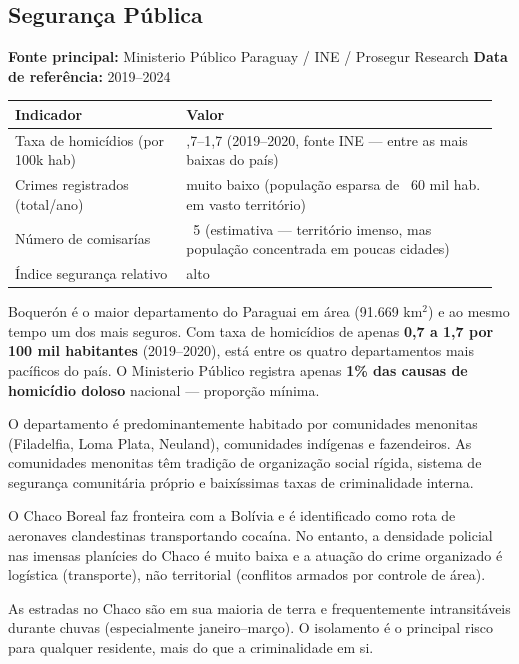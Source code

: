\subsection{Segurança Pública}

\textbf{Fonte principal:} Ministerio Público Paraguay / INE / Prosegur Research
\textbf{Data de referência:} 2019--2024


{\small
\setlength{\tabcolsep}{3pt}
\renewcommand{\arraystretch}{1.12}
\begin{tabularx}{\linewidth}{>{\raggedright\arraybackslash}p{0.34\linewidth} >{\raggedright\arraybackslash}p{0.62\linewidth}}
\toprule
Indicador & Valor \\
\midrule
Taxa de homicídios (por 100k hab) & 0,7--1,7 (2019--2020, fonte INE --- entre as mais baixas do país) \\
Crimes registrados (total/ano) & muito baixo (população esparsa de ~60 mil hab. em vasto território) \\
Número de comisarías & ~5 (estimativa --- território imenso, mas população concentrada em poucas cidades) \\
Índice segurança relativo & alto \\
\bottomrule
\end{tabularx}
}


Boquerón é o maior departamento do Paraguai em área (91.669 km$^2$) e ao mesmo tempo um dos mais seguros. Com taxa de homicídios de apenas \textbf{0,7 a 1,7 por 100 mil habitantes} (2019--2020), está entre os quatro departamentos mais pacíficos do país. O Ministerio Público registra apenas \textbf{1\% das causas de homicídio doloso} nacional --- proporção mínima.

O departamento é predominantemente habitado por comunidades menonitas (Filadelfia, Loma Plata, Neuland), comunidades indígenas e fazendeiros. As comunidades menonitas têm tradição de organização social rígida, sistema de segurança comunitária próprio e baixíssimas taxas de criminalidade interna.

O Chaco Boreal faz fronteira com a Bolívia e é identificado como rota de aeronaves clandestinas transportando cocaína. No entanto, a densidade policial nas imensas planícies do Chaco é muito baixa e a atuação do crime organizado é logística (transporte), não territorial (conflitos armados por controle de área).

As estradas no Chaco são em sua maioria de terra e frequentemente intransitáveis durante chuvas (especialmente janeiro--março). O isolamento é o principal risco para qualquer residente, mais do que a criminalidade em si.


